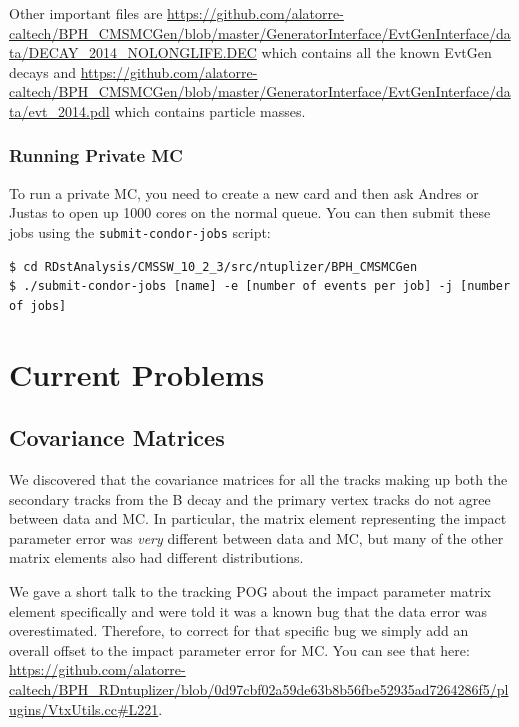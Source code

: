 \documentclass[12pt]{report}
\begin{document}
Other important files are
\url{https://github.com/alatorre-caltech/BPH_CMSMCGen/blob/master/GeneratorInterface/EvtGenInterface/data/DECAY_2014_NOLONGLIFE.DEC}
which contains all the known EvtGen decays and
\url{https://github.com/alatorre-caltech/BPH_CMSMCGen/blob/master/GeneratorInterface/EvtGenInterface/data/evt_2014.pdl}
which contains particle masses.
\subsection{Running Private MC}
To run a private MC, you need to create a new card and then ask Andres or Justas to open up 1000 cores on the normal queue. You can then submit these jobs using the \texttt{submit-condor-jobs} script:
\begin{mdframed}[backgroundcolor=light-gray, roundcorner=10pt,leftmargin=1, rightmargin=1, innerleftmargin=15, innertopmargin=15,innerbottommargin=15, outerlinewidth=1, linecolor=light-gray,roundcorner=20pt]
\begin{lstlisting}
$ cd RDstAnalysis/CMSSW_10_2_3/src/ntuplizer/BPH_CMSMCGen
$ ./submit-condor-jobs [name] -e [number of events per job] -j [number of jobs]
\end{lstlisting}
\end{mdframed}

\chapter{Current Problems}
\section{Covariance Matrices}
We discovered that the covariance matrices for all the tracks making up both
the secondary tracks from the B decay and the primary vertex tracks do not
agree between data and MC. In particular, the matrix element representing the
impact parameter error was \emph{very} different between data and MC, but many
of the other matrix elements also had different distributions.

We gave a short talk to the tracking POG about the impact parameter matrix
element specifically and were told it was a known bug that the data error was
overestimated. Therefore, to correct for that specific bug we simply add an
overall offset to the impact parameter error for MC. You can see that here:
\url{https://github.com/alatorre-caltech/BPH_RDntuplizer/blob/0d97cbf02a59de63b8b56fbe52935ad7264286f5/plugins/VtxUtils.cc#L221}.
\end{document}
